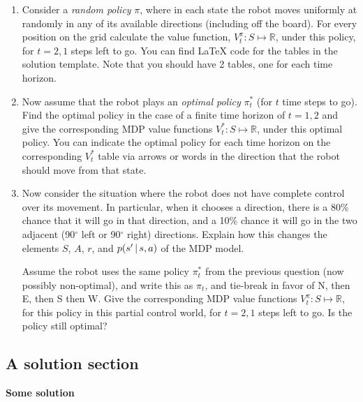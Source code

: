 \documentclass[submit]{harvardml}
\begin{document}
\begin{problem}
\begin{enumerate}
                \item Consider a \emph{random policy} $\pi$, where in each state the robot moves
                    uniformly at randomly in any of its available directions (including off the
                    board). 
                    For every position on the grid calculate the
                    value function, $V^\pi_t: S\mapsto 
                    \mathbb{R}$, under this policy, for $t=2, 1$ steps left to go. You can find
                    LaTeX code for the tables in the solution template. Note that you should have 2
                    tables, one for each time horizon. 
                \item Now assume that the robot plays an \emph{optimal policy}
                    $\pi^\ast_t$ (for $t$ time steps to go). Find the optimal policy in the case of
                    a finite time horizon of $t = 1, 2$ and give the corresponding MDP value
                    functions $V^\ast_t: S\mapsto \mathbb{R}$, under this optimal policy. You can
                    indicate the optimal policy for each time horizon on the corresponding
                    $V^\ast_t$ table via arrows or words in the direction that the robot should move
                    from that state. 
                \item Now consider the situation where the robot does not have
					complete control over its movement. In particular, when it
					chooses a direction, there is a 80\% chance that it will go in that direction,
					and a 10\% chance it will go in the two adjacent (90$^\circ$ left or 90$^\circ$
					right) directions. Explain how this changes the elements $S$, $A$, $r$, and
					$p(s' \,|\, s,a)$ of the MDP model. 

					Assume the robot uses the same policy $\pi^\ast_t$ from the
					previous question (now possibly non-optimal), and write this as $\pi_t$, and
					tie-break in favor of N, then E, then S then W.  Give the corresponding MDP
					value functions $V^\pi_t: S\mapsto \mathbb{R}$, for this policy in this partial
					control world, for $t=2, 1$ steps left to go. Is the policy still optimal?
      \end{enumerate}
    \end{problem}


\subsection*{A solution section}
    \textbf{Some solution}
\end{document}

